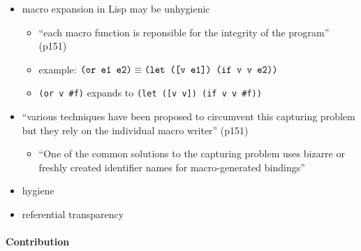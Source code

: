 \documentclass[12pt]{article}	%
\begin{document}
\begin{itemize}

	\item macro expansion in Lisp may be unhygienic
		\begin{itemize}
			\item ``each macro function is reponsible for the integrity of the program'' (p151)
			\item example: $\verb!(or e1 e2)! \equiv \verb!(let ([v e1]) (if v v e2))!$
			\item \verb!(or v #f)! expands to \verb!(let ([v v]) (if v v #f))!
		\end{itemize}
		
	\item ``various techniques have been proposed to circumvent this capturing problem but they rely on the individual macro writer'' (p151)
		\begin{itemize}
			\item ``One of the common solutions to the capturing problem uses bizarre or freshly created identifier names for macro-generated bindings''
		\end{itemize}
	\item hygiene
	\item referential transparency
\end{itemize}
	
\paragraph{Contribution}
\end{document}
